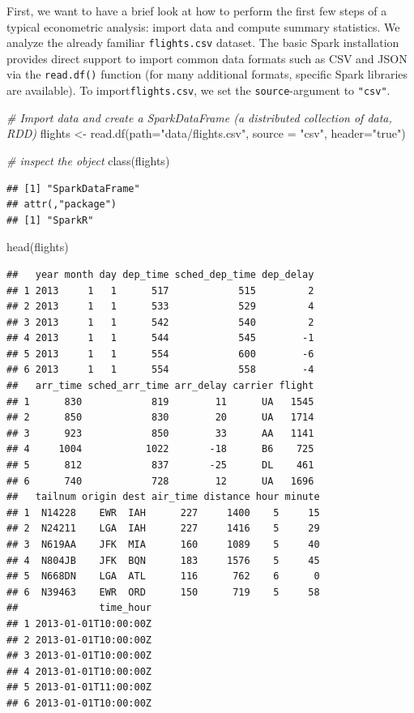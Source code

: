 \documentclass[
  12pt,
]{style/krantz}
\newenvironment{Shaded}{\begin{snugshade}}{\end{snugshade}}
\newcommand{\AttributeTok}[1]{\textcolor[rgb]{0.77,0.63,0.00}{#1}}
\newcommand{\CommentTok}[1]{\textcolor[rgb]{0.56,0.35,0.01}{\textit{#1}}}
\newcommand{\FunctionTok}[1]{\textcolor[rgb]{0.00,0.00,0.00}{#1}}
\newcommand{\NormalTok}[1]{#1}
\newcommand{\OtherTok}[1]{\textcolor[rgb]{0.56,0.35,0.01}{#1}}
\newcommand{\StringTok}[1]{\textcolor[rgb]{0.31,0.60,0.02}{#1}}
\begin{document}
First, we want to have a brief look at how to perform the first few steps of a typical econometric analysis: import data and compute summary statistics. We analyze the already familiar \texttt{flights.csv} dataset. The basic Spark installation provides direct support to import common data formats such as CSV and JSON via the \texttt{read.df()} function (for many additional formats, specific Spark libraries are available). To import\texttt{flights.csv}, we set the \texttt{source}-argument to \texttt{"csv"}.

\begin{Shaded}
\begin{Highlighting}[]
\CommentTok{\# Import data and create a SparkDataFrame (a distributed collection of data, RDD)}
\NormalTok{flights }\OtherTok{\textless{}{-}} \FunctionTok{read.df}\NormalTok{(}\AttributeTok{path=}\StringTok{"data/flights.csv"}\NormalTok{, }\AttributeTok{source =} \StringTok{"csv"}\NormalTok{, }\AttributeTok{header=}\StringTok{"true"}\NormalTok{)}


\CommentTok{\# inspect the object}
\FunctionTok{class}\NormalTok{(flights)}
\end{Highlighting}
\end{Shaded}

\begin{verbatim}
## [1] "SparkDataFrame"
## attr(,"package")
## [1] "SparkR"
\end{verbatim}

\begin{Shaded}
\begin{Highlighting}[]
\FunctionTok{head}\NormalTok{(flights)}
\end{Highlighting}
\end{Shaded}

\begin{verbatim}
##   year month day dep_time sched_dep_time dep_delay
## 1 2013     1   1      517            515         2
## 2 2013     1   1      533            529         4
## 3 2013     1   1      542            540         2
## 4 2013     1   1      544            545        -1
## 5 2013     1   1      554            600        -6
## 6 2013     1   1      554            558        -4
##   arr_time sched_arr_time arr_delay carrier flight
## 1      830            819        11      UA   1545
## 2      850            830        20      UA   1714
## 3      923            850        33      AA   1141
## 4     1004           1022       -18      B6    725
## 5      812            837       -25      DL    461
## 6      740            728        12      UA   1696
##   tailnum origin dest air_time distance hour minute
## 1  N14228    EWR  IAH      227     1400    5     15
## 2  N24211    LGA  IAH      227     1416    5     29
## 3  N619AA    JFK  MIA      160     1089    5     40
## 4  N804JB    JFK  BQN      183     1576    5     45
## 5  N668DN    LGA  ATL      116      762    6      0
## 6  N39463    EWR  ORD      150      719    5     58
##              time_hour
## 1 2013-01-01T10:00:00Z
## 2 2013-01-01T10:00:00Z
## 3 2013-01-01T10:00:00Z
## 4 2013-01-01T10:00:00Z
## 5 2013-01-01T11:00:00Z
## 6 2013-01-01T10:00:00Z
\end{verbatim}
\end{document}
